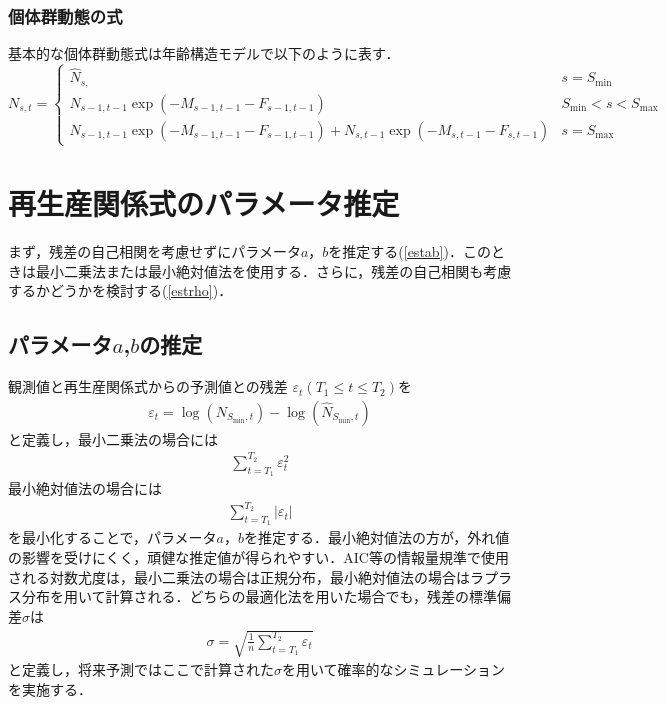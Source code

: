 \documentclass[11pt]{jsarticle}
\begin{document}
\subsubsection*{個体群動態の式}
基本的な個体群動態式は年齢構造モデルで以下のように表す．
\begin{equation}
  N_{s,t} = \begin{cases}
      \hat{N}_{s,}  &     s = S_\mathrm{min} \\    
      N_{s-1, t-1}  \exp(-M_{s-1,t-1}-F_{s-1,t-1} )  &    S_\mathrm{min} < s < S_\mathrm{max} \\
      N_{s-1, t-1}  \exp(-M_{s-1,t-1}-F_{s-1,t-1} ) + N_{s, t-1}  \exp(-M_{s,t-1}-F_{s,t-1}) &   s=S_{\mathrm{max}}
  \end{cases}
  \label{future_eq}
\end{equation}

\section{再生産関係式のパラメータ推定}
まず，残差の自己相関を考慮せずにパラメータ$a$，$b$を推定する(\ref{estab})．このときは最小二乗法または最小絶対値法を使用する．さらに，残差の自己相関も考慮するかどうかを検討する(\ref{estrho})．
\subsection{パラメータ$a$,$b$の推定\label{estab}}
観測値と再生産関係式からの予測値との残差 $\varepsilon_t (T_1 \leq t \leq T_2)$を
\begin{eqnarray}
  \varepsilon_t = \log (N_{S_{\mathrm{min}},t}) - \log (\hat{N}_{S_{\mathrm{min}},t}) 
\end{eqnarray}
と定義し，最小二乗法の場合には
\begin{eqnarray}
  \sum_{t=T_1}^{T_2} \varepsilon_t^2
\end{eqnarray}
最小絶対値法の場合には
\begin{eqnarray}
  \sum_{t=T_1}^{T_2} | \varepsilon_t |
\end{eqnarray}
を最小化することで，パラメータ$a$，$b$を推定する．最小絶対値法の方が，外れ値の影響を受けにくく，頑健な推定値が得られやすい．AIC等の情報量規準で使用される対数尤度は，最小二乗法の場合は正規分布，最小絶対値法の場合はラプラス分布を用いて計算される．どちらの最適化法を用いた場合でも，残差の標準偏差$\sigma$は
\begin{eqnarray}
  \sigma = \sqrt{\frac{1}{n} \sum_{t=T_1}^{T_2} \varepsilon_t}
\end{eqnarray}
と定義し，将来予測ではここで計算された$\sigma$を用いて確率的なシミュレーションを実施する．
\end{document}
